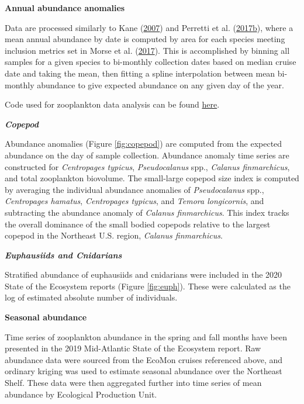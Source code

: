 \documentclass[
]{book}
\begin{document}
\textbf{Annual abundance anomalies}

Data are processed similarly to Kane (\protect\hyperlink{ref-Kane2007}{2007}) and Perretti et al. (\protect\hyperlink{ref-Perretti2017}{2017}\protect\hyperlink{ref-Perretti2017}{b}), where a mean annual abundance by date is computed by area for each species meeting inclusion metrics set in Morse et al. (\protect\hyperlink{ref-Morse2017}{2017}). This is accomplished by binning all samples for a given species to bi-monthly collection dates based on median cruise date and taking the mean, then fitting a spline interpolation between mean bi-monthly abundance to give expected abundance on any given day of the year.

Code used for zooplankton data analysis can be found \href{https://github.com/NOAA-EDAB/tech-doc/blob/master/R/stored_scripts/zooplankton_analysis.R}{here}.

\textbf{\emph{Copepod}}

Abundance anomalies (Figure \ref{fig:copepod}) are computed from the expected abundance on the day of sample collection. Abundance anomaly time series are constructed for \emph{Centropages typicus}, \emph{Pseudocalanus} spp., \emph{Calanus finmarchicus}, and total zooplankton biovolume. The small-large copepod size index is computed by averaging the individual abundance anomalies of \emph{Pseudocalanus} spp., \emph{Centropages hamatus}, \emph{Centropages typicus}, and \emph{Temora longicornis}, and subtracting the abundance anomaly of \emph{Calanus finmarchicus}. This index tracks the overall dominance of the small bodied copepods relative to the largest copepod in the Northeast U.S. region, \emph{Calanus finmarchicus}.

\textbf{\emph{Euphausiids and Cnidarians}}

Stratified abundance of euphausiids and cnidarians were included in the 2020 State of the Ecosystem reports (Figure \ref{fig:euph}). These were calculated as the log of estimated absolute number of individuals.

\textbf{Seasonal abundance}

Time series of zooplankton abundance in the spring and fall months have been presented in the 2019 Mid-Atlantic State of the Ecosystem report. Raw abundance data were sourced from the EcoMon cruises referenced above, and ordinary kriging was used to estimate seasonal abundance over the Northeast Shelf. These data were then aggregated further into time series of mean abundance by Ecological Production Unit.
\end{document}
